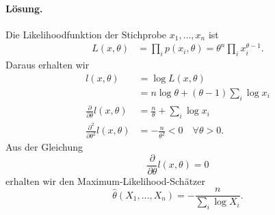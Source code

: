 \paragraph*{Lösung.} Die Likelihoodfunktion der Stichprobe $x_1,\ldots,x_n$ ist
\begin{align*}
    L(x,\theta) &= \prod_i p(x_i, \theta) = \theta^n \prod_i x_i^{\theta-1}.
\end{align*}
Daraus erhalten wir
\begin{align*}
    l(x,\theta) &= \log L(x,\theta) \\
    &= n \log \theta + (\theta-1) \sum_{i}^{} \log x_i \\
    \frac{\partial}{\partial\theta} l(x,\theta) &= \frac{n}{\theta} + \sum_{i}^{} \log x_i \\
    \frac{\partial^2}{\partial \theta^2} l(x,\theta) &= -\frac{n}{\theta^2} < 0 \quad \forall\theta>0.
\end{align*}
Aus der Gleichung
\begin{equation*}
    \frac{\partial}{\partial\theta} l(x,\theta) = 0
\end{equation*}
erhalten wir den Maximum-Likelihood-Schätzer
\begin{equation*}
    \hat \theta(X_1,\ldots,X_n) = - \frac{n}{\sum_{i}^{} \log X_i}.
\end{equation*}

